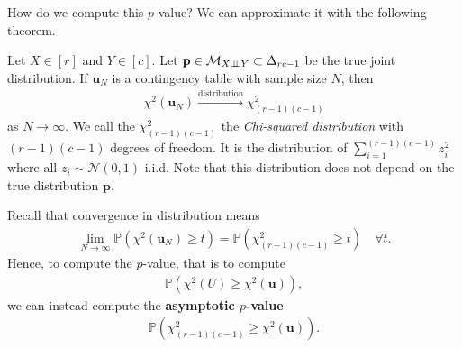 How do we compute this \( p \)-value? We can approximate it with the following theorem.

\begin{thm}
  Let \( X \in [r] \) and \( Y \in [c] \). Let \( \mathbf p \in \mathcal{M}_{X \perp \!\!\! \perp Y} \subset \Delta_{rc - 1}\) be the true joint distribution. If \( \mathbf u_N \) is a contingency table with sample size \( N \), then 
  \begin{align*}
    \chi^2(\mathbf u_N) \overset{\text{distribution}}{\to} \chi^2_{(r-1)(c-1)}
  \end{align*}
  as \( N \to \infty \). We call the \( \chi^2_{(r-1)(c-1)} \) the \emph{Chi-squared distribution} with \( (r-1)(c-1) \) degrees of freedom. It is the distribution of \( \sum_{i=1}^{(r-1)(c-1)} z_i^2 \) where all \( z_i \sim \mathcal{N}(0,1) \) i.i.d. Note that this distribution does not depend on the true distribution \( \mathbf p \).
\end{thm}

Recall that convergence in distribution means 
\begin{align*}
  \lim_{N \to \infty} \mathbb{P}(\chi^2(\mathbf u_N) \geq t) = \mathbb{P}(\chi^2_{(r-1)(c-1)} \geq t) \quad \forall t.
\end{align*}
Hence, to compute the \( p \)-value, that is to compute 
\begin{align*}
  \mathbb{P}(\chi^2(U) \geq \chi^2(\mathbf u)),
\end{align*}
we can instead compute the \textbf{asymptotic \( p \)-value}
\begin{align*}
  \mathbb{P}(\chi^2_{(r-1)(c-1)} \geq \chi^2(\mathbf u)) .
\end{align*}

